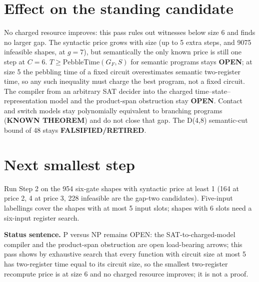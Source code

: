 \documentclass[11pt]{article}
\begin{document}
\section*{Effect on the standing candidate}
No charged resource improves: this pass rules out witnesses below size 6 and finds no larger gap. The syntactic price grows with size (up to 5 extra steps, and 9075 infeasible shapes, at $g=7$), but semantically the only known price is still one step at $C=6$. $T\ge\mathrm{PebbleTime}(G_F,S)$ for semantic programs stays \textbf{OPEN}; at size 5 the pebbling time of a fixed circuit overestimates semantic two-register time, so any such inequality must charge the best program, not a fixed circuit. The compiler from an arbitrary SAT decider into the charged time--state--representation model and the product-span obstruction stay \textbf{OPEN}. Contact and switch models stay polynomially equivalent to branching programs (\textbf{KNOWN THEOREM}) and do not close that gap. The D(4,8) semantic-cut bound of 48 stays \textbf{FALSIFIED/RETIRED}.

\section*{Next smallest step}
Run Step 2 on the 954 six-gate shapes with syntactic price at least 1 (164 at price 2, 4 at price 3, 228 infeasible are the gap-two candidates). Five-input labellings cover the shapes with at most 5 input slots; shapes with 6 slots need a six-input register search.

\bigskip
\noindent\textbf{Status sentence.} P versus NP remains OPEN: the SAT-to-charged-model compiler and the product-span obstruction are open load-bearing arrows; this pass shows by exhaustive search that every function with circuit size at most 5 has two-register time equal to its circuit size, so the smallest two-register recompute price is at size 6 and no charged resource improves; it is not a proof.
\end{document}
